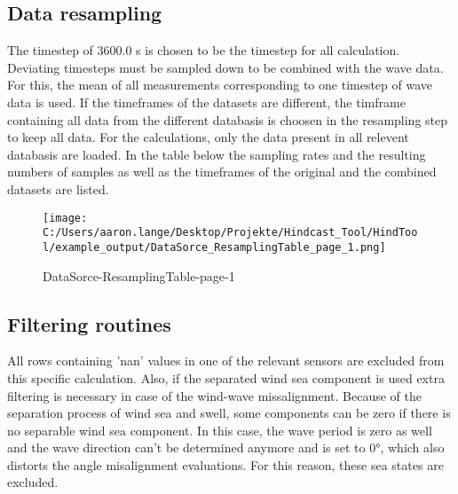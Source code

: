 \subsection{Data resampling} 
The timestep of 3600.0 s is chosen to be the timestep for all calculation. Deviating timesteps must be sampled down to be combined with the wave data. For this, the mean of all measurements corresponding to one timestep of wave data is used.
If the timeframes of the datasets are different, the timframe containing all data from the different databasis is choosen in the resampling step to keep all data. For the calculations, only the data present in all relevent databasis are loaded.  In the table below the sampling rates and the resulting numbers of samples as well as the timeframes of the original and the combined datasets are listed.

\begin{figure}[H] 
 \centering 
 \texttt{[image: C:/Users/aaron.lange/Desktop/Projekte/Hindcast\_Tool/HindTool/example\_output/DataSorce\_ResamplingTable\_page\_1.png]} 
 \captionsetup{type=table} 
\caption{ DataSorce-ResamplingTable-page-1 } 
 \label{tab: DataSorce_ResamplingTable_page_1 } 
\end{figure}

\subsection{Filtering routines}
All rows containing 'nan' values in one of the relevant sensors are excluded from this specific calculation.  
Also, if the separated wind sea component is used extra filtering is necessary in case of the wind-wave missalignment. Because of the separation process of wind sea and swell, some components can be zero if there is no separable wind sea component. In this case, the wave period is zero as well and the wave direction can’t be determined anymore and is set to 0°, which also distorts the angle misalignment evaluations. For this reason, these sea states are excluded. 